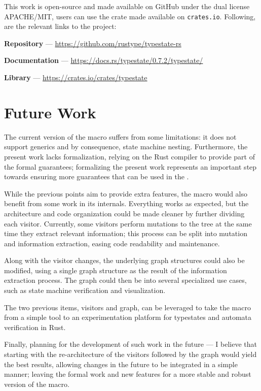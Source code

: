 
This work is open-source and made available on GitHub under the dual license APACHE/MIT,
users can use the crate made available on \texttt{crates.io}.
Following, are the relevant links to the project:
\begin{compactitem}
    \item \textbf{Repository} --- \url{https://github.com/rustype/typestate-rs}
    \item \textbf{Documentation} --- \url{https://docs.rs/typestate/0.7.2/typestate/}
    \item \textbf{Library} --- \url{https://crates.io/crates/typestate}
\end{compactitem}

\section{Future Work}

The current version of the macro suffers from some limitations:
it does not support generics and by consequence, state machine nesting.
Furthermore, the present work lacks formalization, relying on the Rust compiler to provide part of the formal guarantees;
formalizing the present work represents an important step towards ensuring more guarantees that can be used in the .

While the previous points aim to provide extra features, the macro would also benefit from some work in its internals.
Everything works as expected, but the architecture and code organization could be made cleaner by further dividing each visitor.
Currently, some visitors perform mutations to the tree at the same time they extract relevant information;
this process can be split into mutation and information extraction, easing code readability and maintenance.

Along with the visitor changes, the underlying graph structures could also be modified,
using a single graph structure as the result of the information extraction process.
The graph could then be  into several specialized use cases, such as state machine verification and visualization.

The two previous items, visitors and graph,
can be leveraged to take the macro from a simple tool to an experimentation platform for typestates and automata verification in Rust.

Finally, planning for the development of such work in the future ---
I believe that starting with the re-architecture of the visitors followed by the graph would yield the best results,
allowing changes in the future to be integrated in a simple manner;
leaving the formal work and new features for a more stable and robust version of the macro.
